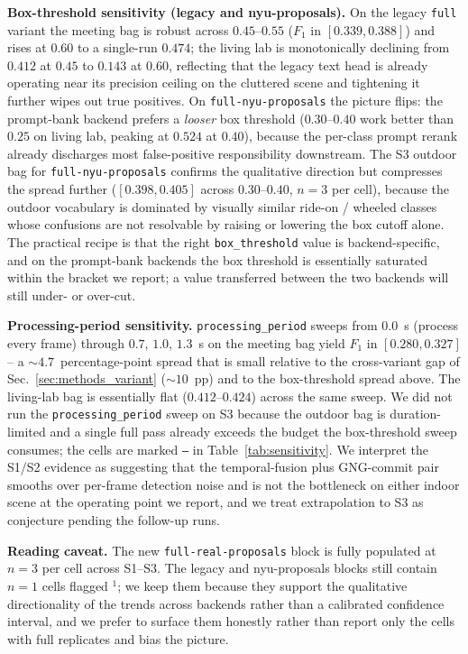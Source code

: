 \noindent\textbf{Box-threshold sensitivity (legacy and
nyu-proposals).}
On the legacy \texttt{full} variant the meeting bag is robust across
$0.45$--$0.55$ ($F_1$ in $[0.339, 0.388]$) and rises at $0.60$ to a
single-run $0.474$; the living lab is monotonically declining from
$0.412$ at $0.45$ to $0.143$ at $0.60$, reflecting that the legacy
text head is already operating near its precision ceiling on the
cluttered scene and tightening it further wipes out true positives.
On \texttt{full-nyu-proposals} the picture flips: the prompt-bank
backend prefers a \emph{looser} box threshold ($0.30$--$0.40$ work
better than $0.25$ on living lab, peaking at $0.524$ at $0.40$),
because the per-class prompt rerank already discharges most
false-positive responsibility downstream. The S3 outdoor bag for
\texttt{full-nyu-proposals} confirms the qualitative direction but
compresses the spread further ($[0.398, 0.405]$ across $0.30$--$0.40$,
$n{=}3$ per cell), because the outdoor vocabulary is dominated by
visually similar ride-on / wheeled classes whose confusions are not
resolvable by raising or lowering the box cutoff alone. The
practical recipe is that the right \texttt{box\_threshold} value is
backend-specific, and on the prompt-bank backends the box threshold
is essentially saturated within the bracket we report; a value
transferred between the two backends will still under- or over-cut.

\noindent\textbf{Processing-period sensitivity.}
\texttt{processing\_period} sweeps from $0.0$~s (process every frame)
through $0.7$, $1.0$, $1.3$~s on the meeting bag yield $F_1$ in
$[0.280, 0.327]$ -- a $\sim 4.7$~percentage-point spread that is
small relative to the cross-variant gap of Sec.~\ref{sec:methods_variant}
($\sim 10$~pp) and to the box-threshold spread above. The living-lab
bag is essentially flat ($0.412$--$0.424$) across the same sweep.
We did not run the \texttt{processing\_period} sweep on S3 because
the outdoor bag is duration-limited and a single full pass already
exceeds the budget the box-threshold sweep consumes; the cells are
marked \texttt{---} in Table~\ref{tab:sensitivity}. We interpret the
S1/S2 evidence as suggesting that the temporal-fusion plus
GNG-commit pair smooths over per-frame detection noise and is not
the bottleneck on either indoor scene at the operating point we
report, and we treat extrapolation to S3 as conjecture pending the
follow-up runs.

\noindent\textbf{Reading caveat.}
The new \texttt{full-real-proposals} block is fully populated at
$n{=}3$ per cell across S1--S3. The legacy and nyu-proposals blocks
still contain $n{=}1$ cells flagged $^{1}$; we keep them because
they support the qualitative directionality of the trends across
backends rather than a calibrated confidence interval, and we prefer
to surface them honestly rather than report only the cells with full
replicates and bias the picture.


